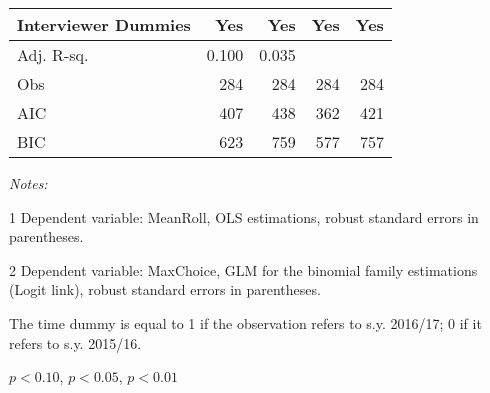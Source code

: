\begin{table}[htbp]
\begin{threeparttable}
\begin{tabular}{l*{4}{D{.}{.}{-1}}}
Interviewer Dummies
&                 Yes   &                 Yes   &                 Yes   &                 Yes   \\
\midrule
Adj. R-sq.          &               0.100   &               0.035   &                      &                       \\
Obs                 &                 284   &                 284   &                 284   &                 284   \\
AIC                 &                 407   &                 438   &                 362   &                 421   \\
BIC                 &                 623   &                 759   &                 577   &                 757   \\
\bottomrule
\end{tabular}
\begin{tablenotes}
\footnotesize
\item \textit{Notes:} 
\item[1] Dependent variable: MeanRoll, OLS estimations, robust standard errors in parentheses.
\item[2] Dependent variable: MaxChoice, GLM for the binomial family estimations (Logit link), robust standard errors in parentheses.
\item The time dummy is equal to 1 if the observation refers to s.y. 2016/17; 0 if it refers to s.y. 2015/16.
\item \sym{*} \(p<0.10\), \sym{**} \(p<0.05\), \sym{***} \(p<0.01\)
\end{tablenotes}
\end{threeparttable}
\label{tab:stability}
\end{table}
